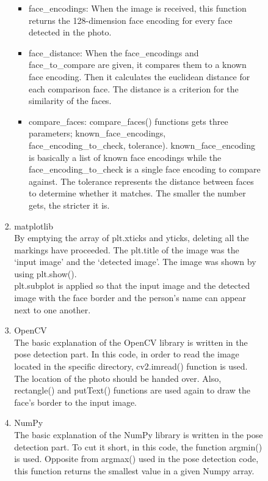 \documentclass[conference]{IEEEtran}
\begin{document}
\begin{enumerate}[label=\arabic*.]
\begin{enumerate}[label=\arabic*.]
\begin{enumerate}[label=\alph*.]
\begin{enumerate}[label=\roman*.]
\begin{itemize}
                \item face\_encodings: When the image is received, this function returns the 128-dimension face encoding for every face detected in the photo. \\
                \item face\_distance: When the face\_encodings and face\_to\_compare are given, it compares them to a known face encoding. Then it calculates the euclidean distance for each comparison face. The distance is a criterion for the similarity of the faces. \\
                \item compare\_faces: compare\_faces() functions gets three parameters; known\_face\_encodings, face\_encoding\_to\_check, tolerance). known\_face\_encoding is basically a list of known face encodings while the face\_encoding\_to\_check is a single face encoding to compare against. The tolerance represents the distance between faces to determine whether it matches. The smaller the number gets, the stricter it is. \\
            \end{itemize}
            \item{\large{matplotlib}}\\
            By emptying the array of plt.xticks and yticks, deleting all the markings have proceeded. The plt.title of the image was the ‘input image’ and the ‘detected image’. The image was shown by using plt.show().\\
            plt.subplot is applied so that the input image and the detected image with the face border and the person’s name can appear next to one another. \\
            \item{\large{OpenCV}}\\
            The basic explanation of the OpenCV library is written in the pose detection part. In this code, in order to read the image located in the specific directory, cv2.imread() function is used. The location of the photo should be handed over. Also, rectangle() and putText() functions are used again to draw the face’s border to the input image. \\
            \item{\large{NumPy}}\\
            The basic explanation of the NumPy library is written in the pose detection part. To cut it short, in this code, the function argmin() is used. Opposite from argmax() used in the pose detection code,  this function returns the smallest value in a given Numpy array. \\


\end{enumerate}
\end{enumerate}
\end{enumerate}
\end{enumerate}
\end{document}
